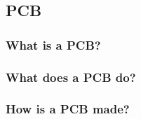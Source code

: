 \subsection{PCB}
\subsubsection{What is a PCB?}

\subsubsection{What does a PCB do?}

\subsubsection{How is a PCB made?}